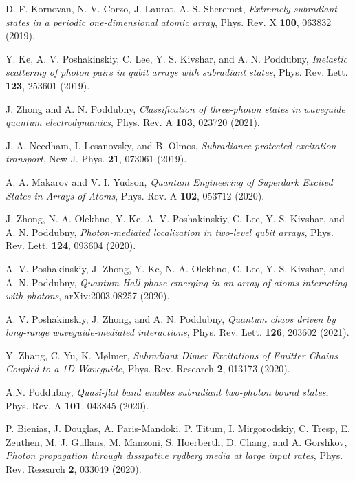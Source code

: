 \documentclass[pra,twocolumn,showpacs,preprintnumbers,amsmath,amssymb]{revtex4-1}
\begin{document}
\begin{thebibliography}{99}
  D. F. Kornovan, N. V. Corzo, J. Laurat,  A. S. Sheremet,  \textit{Extremely subradiant states in a periodic one-dimensional atomic array}, Phys. Rev. X  {\bf 100}, 063832 (2019).

 Y. Ke, A. V. Poshakinskiy, C. Lee, Y. S. Kivshar, and A. N. Poddubny, \textit{Inelastic scattering of photon pairs in qubit arrays with subradiant states}, Phys. Rev. Lett. {\bf 123}, 253601 (2019).

 J. Zhong and A. N. Poddubny, \textit{Classification of three-photon states in waveguide quantum electrodynamics}, Phys. Rev. A  {\bf 103}, 023720 (2021).

 J. A. Needham,  I. Lesanovsky, and B. Olmos,
\textit{Subradiance-protected excitation transport},  New J. Phys. {\bf 21}, 073061 (2019).


 A. A. Makarov  and V. I. Yudson, \textit{Quantum Engineering of Superdark Excited States in Arrays of Atoms}, Phys. Rev. A {\bf 102}, 053712 (2020).





 J. Zhong, N. A. Olekhno, Y. Ke, A. V. Poshakinskiy, C. Lee, Y. S. Kivshar, and A. N. Poddubny, \textit{Photon-mediated localization in two-level qubit arrays}, Phys. Rev. Lett. {\bf 124}, 093604 (2020).



  A. V. Poshakinskiy, J. Zhong, Y. Ke, N. A. Olekhno,  C. Lee, Y. S. Kivshar, and A. N. Poddubny, \textit{Quantum Hall phase emerging in an array of atoms interacting with photons}, arXiv:2003.08257  (2020).

  A. V. Poshakinskiy, J. Zhong, and A. N. Poddubny, \textit{Quantum chaos driven by long-range waveguide-mediated interactions}, Phys. Rev. Lett. {\bf 126}, 203602 (2021). 

  Y. Zhang, C. Yu, K. M\o lmer, \textit{Subradiant Dimer Excitations of Emitter Chains Coupled to a 1D Waveguide}, Phys. Rev. Research {\bf 2}, 013173 (2020).


  A.N. Poddubny, \textit{Quasi-flat band enables subradiant two-photon bound states}, Phys. Rev. A  {\bf 101}, 043845 (2020).







 P. Bienias, J. Douglas, A. Paris-Mandoki, P. Titum,
I. Mirgorodskiy, C. Tresp, E. Zeuthen, M. J. Gullans, M. Manzoni, S. Hoerberth, D. Chang, and A. Gorshkov,  \textit{Photon propagation through dissipative rydberg media at large input rates}, Phys. Rev. Research {\bf 2}, 033049 (2020).




\end{thebibliography}
\end{document}
